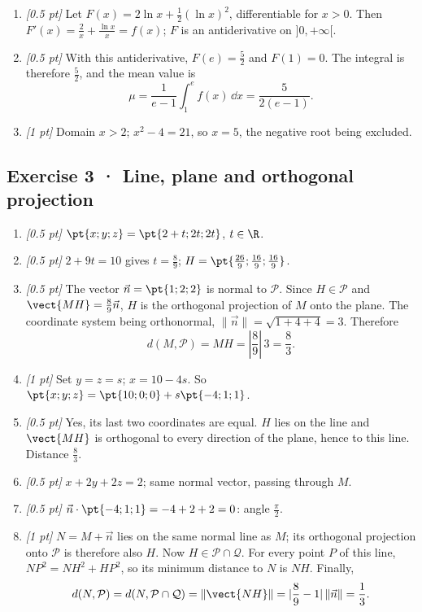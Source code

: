 \begin{enumerate}
\item \textit{[0.5 pt]} Let $F(x)=2\ln x+\frac12(\ln x)^2$, differentiable for $x>0$. Then $F'(x)=\frac{2}{x}+\frac{\ln x}{x}=f(x)$; $F$ is an antiderivative on $]0,+\infty[$.

\item \textit{[0.5 pt]} With this antiderivative, $F(e)=\frac{5}{2}$ and $F(1)=0$. The integral is therefore $\frac{5}{2}$, and the mean value is
\[\mu=\frac{1}{e-1}\int_1^e f(x)\,\dd x=\frac{5}{2(e-1)}.\]

\item \textit{[1 pt]} Domain $x>2$; $x^2-4=21$, so $x=5$, the negative root being excluded.

\end{enumerate}

\subsection*{Exercise 3 · Line, plane and orthogonal projection}\begin{enumerate}

\item \textit{[0.5 pt]} $\pt{x;y;z}=\pt{2+t;2t;2t}$, $t\in\R$.

\item \textit{[0.5 pt]} $2+9t=10$ gives $t=\frac{8}{9}$; $H=\pt{\frac{26}{9};\frac{16}{9};\frac{16}{9}}$.

\item \textit{[0.5 pt]} The vector $\vec n=\pt{1;2;2}$ is normal to $\mathcal P$. Since $H\in\mathcal P$ and $\vect{MH}=\frac{8}{9}\vec n$, $H$ is the orthogonal projection of $M$ onto the plane. The coordinate system being orthonormal, $\|\vec n\|=\sqrt{1+4+4}=3$. Therefore
\[d(M,\mathcal P)=MH=|\frac{8}{9}|\,3=\frac{8}{3}.\]

\item \textit{[1 pt]} Set $y=z=s$; $x=10-4s$. So $\pt{x;y;z}=\pt{10;0;0}+s\pt{-4;1;1}$.

\item \textit{[0.5 pt]} Yes, its last two coordinates are equal. $H$ lies on the line and $\vect{MH}$ is orthogonal to every direction of the plane, hence to this line. Distance $\frac{8}{3}$.

\item \textit{[0.5 pt]} $x+2y+2z=2$; same normal vector, passing through $M$.

\item \textit{[0.5 pt]} $\vec n\cdot\pt{-4;1;1}=-4+2+2=0$: angle $\frac{\pi}{2}$.

\item \textit{[1 pt]} $N=M+\vec n$ lies on the same normal line as $M$; its orthogonal projection onto $\mathcal P$ is therefore also $H$. Now $H\in\mathcal P\cap\mathcal Q$. For every point $P$ of this line, $NP^2=NH^2+HP^2$, so its minimum distance to $N$ is $NH$. Finally,
\[d(N,\mathcal P)=d(N,\mathcal P\cap\mathcal Q)=\|\vect{NH}\|=|\frac{8}{9}-1|\,\|\vec n\|=\frac{1}{3}.\]

\end{enumerate}

